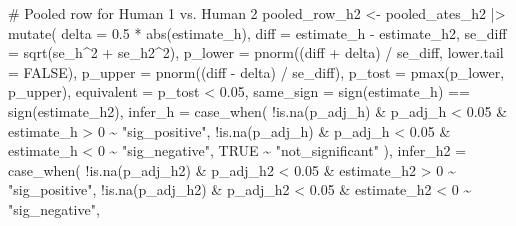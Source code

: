 \documentclass[
  letterpaper,
  DIV=11,
  numbers=noendperiod]{scrartcl}
\newenvironment{Shaded}{\begin{snugshade}}{\end{snugshade}}
\newcommand{\AttributeTok}[1]{\textcolor[rgb]{0.40,0.45,0.13}{#1}}
\newcommand{\CommentTok}[1]{\textcolor[rgb]{0.37,0.37,0.37}{#1}}
\newcommand{\ConstantTok}[1]{\textcolor[rgb]{0.56,0.35,0.01}{#1}}
\newcommand{\DecValTok}[1]{\textcolor[rgb]{0.68,0.00,0.00}{#1}}
\newcommand{\FloatTok}[1]{\textcolor[rgb]{0.68,0.00,0.00}{#1}}
\newcommand{\FunctionTok}[1]{\textcolor[rgb]{0.28,0.35,0.67}{#1}}
\newcommand{\NormalTok}[1]{\textcolor[rgb]{0.00,0.23,0.31}{#1}}
\newcommand{\OtherTok}[1]{\textcolor[rgb]{0.00,0.23,0.31}{#1}}
\newcommand{\SpecialCharTok}[1]{\textcolor[rgb]{0.37,0.37,0.37}{#1}}
\newcommand{\StringTok}[1]{\textcolor[rgb]{0.13,0.47,0.30}{#1}}
\begin{document}
\begin{Shaded}
\begin{Highlighting}[]
\CommentTok{\# Pooled row for Human 1 vs. Human 2}
\NormalTok{pooled\_row\_h2 }\OtherTok{\textless{}{-}}\NormalTok{ pooled\_ates\_h2 }\SpecialCharTok{|\textgreater{}}
  \FunctionTok{mutate}\NormalTok{(}
    \AttributeTok{delta      =} \FloatTok{0.5} \SpecialCharTok{*} \FunctionTok{abs}\NormalTok{(estimate\_h),}
    \AttributeTok{diff       =}\NormalTok{ estimate\_h }\SpecialCharTok{{-}}\NormalTok{ estimate\_h2,}
    \AttributeTok{se\_diff    =} \FunctionTok{sqrt}\NormalTok{(se\_h}\SpecialCharTok{\^{}}\DecValTok{2} \SpecialCharTok{+}\NormalTok{ se\_h2}\SpecialCharTok{\^{}}\DecValTok{2}\NormalTok{),}
    \AttributeTok{p\_lower    =} \FunctionTok{pnorm}\NormalTok{((diff }\SpecialCharTok{+}\NormalTok{ delta) }\SpecialCharTok{/}\NormalTok{ se\_diff, }\AttributeTok{lower.tail =} \ConstantTok{FALSE}\NormalTok{),}
    \AttributeTok{p\_upper    =} \FunctionTok{pnorm}\NormalTok{((diff }\SpecialCharTok{{-}}\NormalTok{ delta) }\SpecialCharTok{/}\NormalTok{ se\_diff),}
    \AttributeTok{p\_tost     =} \FunctionTok{pmax}\NormalTok{(p\_lower, p\_upper),}
    \AttributeTok{equivalent =}\NormalTok{ p\_tost }\SpecialCharTok{\textless{}} \FloatTok{0.05}\NormalTok{,}
    \AttributeTok{same\_sign  =} \FunctionTok{sign}\NormalTok{(estimate\_h) }\SpecialCharTok{==} \FunctionTok{sign}\NormalTok{(estimate\_h2),}
    \AttributeTok{infer\_h    =} \FunctionTok{case\_when}\NormalTok{(}
      \SpecialCharTok{!}\FunctionTok{is.na}\NormalTok{(p\_adj\_h)  }\SpecialCharTok{\&}\NormalTok{ p\_adj\_h  }\SpecialCharTok{\textless{}} \FloatTok{0.05} \SpecialCharTok{\&}\NormalTok{ estimate\_h  }\SpecialCharTok{\textgreater{}} \DecValTok{0} \SpecialCharTok{\textasciitilde{}} \StringTok{"sig\_positive"}\NormalTok{,}
      \SpecialCharTok{!}\FunctionTok{is.na}\NormalTok{(p\_adj\_h)  }\SpecialCharTok{\&}\NormalTok{ p\_adj\_h  }\SpecialCharTok{\textless{}} \FloatTok{0.05} \SpecialCharTok{\&}\NormalTok{ estimate\_h  }\SpecialCharTok{\textless{}} \DecValTok{0} \SpecialCharTok{\textasciitilde{}} \StringTok{"sig\_negative"}\NormalTok{,}
      \ConstantTok{TRUE} \SpecialCharTok{\textasciitilde{}} \StringTok{"not\_significant"}
\NormalTok{    ),}
    \AttributeTok{infer\_h2   =} \FunctionTok{case\_when}\NormalTok{(}
      \SpecialCharTok{!}\FunctionTok{is.na}\NormalTok{(p\_adj\_h2) }\SpecialCharTok{\&}\NormalTok{ p\_adj\_h2 }\SpecialCharTok{\textless{}} \FloatTok{0.05} \SpecialCharTok{\&}\NormalTok{ estimate\_h2 }\SpecialCharTok{\textgreater{}} \DecValTok{0} \SpecialCharTok{\textasciitilde{}} \StringTok{"sig\_positive"}\NormalTok{,}
      \SpecialCharTok{!}\FunctionTok{is.na}\NormalTok{(p\_adj\_h2) }\SpecialCharTok{\&}\NormalTok{ p\_adj\_h2 }\SpecialCharTok{\textless{}} \FloatTok{0.05} \SpecialCharTok{\&}\NormalTok{ estimate\_h2 }\SpecialCharTok{\textless{}} \DecValTok{0} \SpecialCharTok{\textasciitilde{}} \StringTok{"sig\_negative"}\NormalTok{,}

\end{Highlighting}
\end{Shaded}
\end{document}
